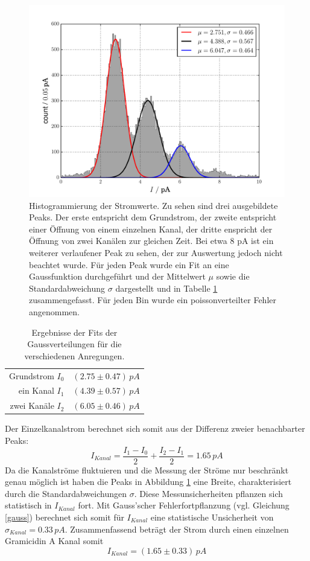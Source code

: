 \documentclass{include/thesisclass3}
\newcommand{\e}[1]{\,\si{#1}}
\begin{document}
\begin{figure}[H]
\centering
\includegraphics[scale=0.7]{images/single_hist.pdf}
\caption{Histogrammierung der Stromwerte. Zu sehen sind drei ausgebildete Peaks. Der erste entspricht dem Grundstrom, der zweite entspricht einer Öffnung von einem einzelnen Kanal, der dritte enspricht der Öffnung von zwei Kanälen zur gleichen Zeit. Bei etwa 8 pA ist ein weiterer verlaufener Peak zu sehen, der zur Auswertung jedoch nicht beachtet wurde. Für jeden Peak wurde ein Fit an eine Gaussfunktion durchgeführt und der Mittelwert $\mu$ sowie die Standardabweichung $\sigma$ dargestellt und in Tabelle \ref{singlefits} zusammengefasst. Für jeden Bin wurde ein poissonverteilter Fehler angenommen.}
\label{singlehist}
\end{figure}
\begin{table}[H]
\centering
\caption{Ergebnisse der Fits der Gaussverteilungen für die verschiedenen Anregungen.}
\label{singlefits}
\begin{tabular}{rl}
\toprule
Grundstrom $I_0$ & $(2.75 \pm 0.47)\e{pA}$\\
ein Kanal $I_1$ & $(4.39 \pm 0.57)\e{pA}$\\
zwei Kanäle $I_2$ & $(6.05\pm 0.46)\e{pA}$\\
\bottomrule
\end{tabular}
\end{table}
Der Einzelkanalstrom berechnet sich somit aus der Differenz zweier benachbarter Peaks:
\[
I_{Kanal} = \frac{I_1-I_0}{2} + \frac{I_2-I_1}{2} = 1.65\e{pA}\]
Da die Kanalströme fluktuieren und die Messung der Ströme nur beschränkt genau möglich ist haben die Peaks in Abbildung \ref{singlehist} eine Breite, charakterisiert durch die Standardabweichungen $\sigma$. Diese Messunsicherheiten pflanzen sich statistisch in $I_{Kanal}$ fort. Mit Gauss'scher Fehlerfortpflanzung (vgl. Gleichung \ref{gauss}) berechnet sich somit für $I_{Kanal}$ eine statistische Unsicherheit von $\sigma_{Kanal} = 0.33\e{pA}$. Zusammenfassend beträgt der Strom durch einen einzelnen Gramicidin A Kanal somit
\[ I_{Kanal} = (1.65 \pm 0.33)\e{pA}\]
\end{document}

